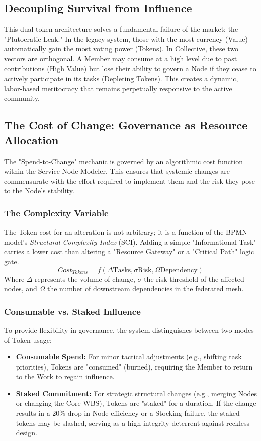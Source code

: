 \subsection{Decoupling Survival from Influence}
This dual-token architecture solves a fundamental failure of the market: the "Plutocratic Leak." In the legacy system, those with the most currency (Value) automatically gain the most voting power (Tokens). In Collective, these two vectors are orthogonal. A Member may consume at a high level due to past contributions (High Value) but lose their ability to govern a Node if they cease to actively participate in its tasks (Depleting Tokens). This creates a dynamic, labor-based meritocracy that remains perpetually responsive to the active community.

\subsection{The Cost of Change: Governance as Resource Allocation}
The "Spend-to-Change" mechanic is governed by an algorithmic cost function within the Service Node Modeler. This ensures that systemic changes are commensurate with the effort required to implement them and the risk they pose to the Node's stability.

\subsubsection{The Complexity Variable}
The Token cost for an alteration is not arbitrary; it is a function of the BPMN model’s \textit{Structural Complexity Index} (SCI). Adding a simple "Informational Task" carries a lower cost than altering a "Resource Gateway" or a "Critical Path" logic gate. 
\[ Cost_{Tokens} = f( \Delta \text{Tasks}, \sigma \text{Risk}, \Omega \text{Dependency} ) \]
Where $\Delta$ represents the volume of change, $\sigma$ the risk threshold of the affected nodes, and $\Omega$ the number of downstream dependencies in the federated mesh.

\subsubsection{Consumable vs. Staked Influence}
To provide flexibility in governance, the system distinguishes between two modes of Token usage:
\begin{itemize}[leftmargin=*]
    \item \textbf{Consumable Spend:} For minor tactical adjustments (e.g., shifting task priorities), Tokens are "consumed" (burned), requiring the Member to return to the Work to regain influence.
    \item \textbf{Staked Commitment:} For strategic structural changes (e.g., merging Nodes or changing the Core WBS), Tokens are "staked" for a duration. If the change results in a 20\% drop in Node efficiency or a Stocking failure, the staked tokens may be slashed, serving as a high-integrity deterrent against reckless design.
\end{itemize}


